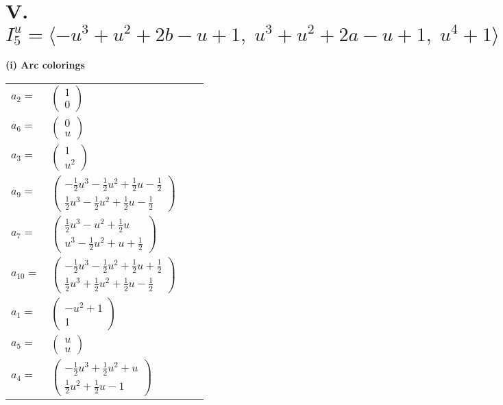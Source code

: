 \documentclass[1p]{elsarticle_modified}
\theoremstyle{definition}
\begin{document}
\centering \section*{V. $I^u_{5}= \langle - u^3+u^2+2 b- u+1,\;u^3+u^2+2 a- u+1,\;u^4+1 \rangle$}
\flushleft \textbf{(i) Arc colorings}\\
\begin{tabular}{m{7pt} m{180pt} m{7pt} m{180pt} }
\flushright $a_{2}=$&$\begin{pmatrix}1\\0\end{pmatrix}$ \\
\flushright $a_{6}=$&$\begin{pmatrix}0\\u\end{pmatrix}$ \\
\flushright $a_{3}=$&$\begin{pmatrix}1\\u^2\end{pmatrix}$ \\
\flushright $a_{9}=$&$\begin{pmatrix}-\frac{1}{2} u^3-\frac{1}{2} u^2+\frac{1}{2} u-\frac{1}{2}\\\frac{1}{2} u^3-\frac{1}{2} u^2+\frac{1}{2} u-\frac{1}{2}\end{pmatrix}$ \\
\flushright $a_{7}=$&$\begin{pmatrix}\frac{1}{2} u^3- u^2+\frac{1}{2} u\\u^3-\frac{1}{2} u^2+u+\frac{1}{2}\end{pmatrix}$ \\
\flushright $a_{10}=$&$\begin{pmatrix}-\frac{1}{2} u^3-\frac{1}{2} u^2+\frac{1}{2} u+\frac{1}{2}\\\frac{1}{2} u^3+\frac{1}{2} u^2+\frac{1}{2} u-\frac{1}{2}\end{pmatrix}$ \\
\flushright $a_{1}=$&$\begin{pmatrix}- u^2+1\\1\end{pmatrix}$ \\
\flushright $a_{5}=$&$\begin{pmatrix}u\\u\end{pmatrix}$ \\
\flushright $a_{4}=$&$\begin{pmatrix}-\frac{1}{2} u^3+\frac{1}{2} u^2+u\\\frac{1}{2} u^2+\frac{1}{2} u-1\end{pmatrix}$ \\

\end{tabular}
\end{document}
